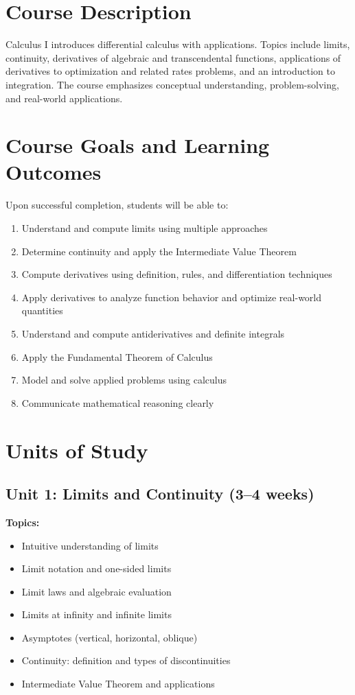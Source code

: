 \documentclass[12pt,oneside]{book}
\begin{document}
\section{Course Description}

Calculus I introduces differential calculus with applications. Topics include limits, continuity, derivatives of algebraic and transcendental functions, applications of derivatives to optimization and related rates problems, and an introduction to integration. The course emphasizes conceptual understanding, problem-solving, and real-world applications.

\section{Course Goals and Learning Outcomes}

Upon successful completion, students will be able to:

\begin{enumerate}
    \item Understand and compute limits using multiple approaches
    \item Determine continuity and apply the Intermediate Value Theorem
    \item Compute derivatives using definition, rules, and differentiation techniques
    \item Apply derivatives to analyze function behavior and optimize real-world quantities
    \item Understand and compute antiderivatives and definite integrals
    \item Apply the Fundamental Theorem of Calculus
    \item Model and solve applied problems using calculus
    \item Communicate mathematical reasoning clearly
\end{enumerate}

\section{Units of Study}

\subsection{Unit 1: Limits and Continuity (3--4 weeks)}

\textbf{Topics:}
\begin{itemize}
    \item Intuitive understanding of limits
    \item Limit notation and one-sided limits
    \item Limit laws and algebraic evaluation
    \item Limits at infinity and infinite limits
    \item Asymptotes (vertical, horizontal, oblique)
    \item Continuity: definition and types of discontinuities
    \item Intermediate Value Theorem and applications
\end{itemize}
\end{document}

